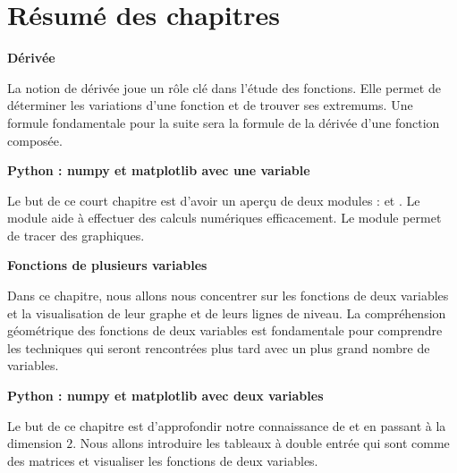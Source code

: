 

\cleardoublepage
\thispagestyle{empty}
\tableofcontents

\cleardoublepage
\section*{Résumé des chapitres}


\newcommand{\titrechapitre}[1]{{\textbf{#1}}\nopagebreak}
\newcommand{\descriptionchapitre}[1]{%
\smallskip\hfill
\begin{minipage}{0.95\textwidth}\small#1\end{minipage}\medskip\smallskip}

\titrechapitre{Dérivée}

\descriptionchapitre{La notion de dérivée joue un rôle clé dans l'étude des fonctions. Elle permet de déterminer les variations d'une fonction et de trouver ses extremums. Une formule fondamentale pour la suite sera la formule de la dérivée d'une fonction composée.}

\titrechapitre{Python : numpy et matplotlib avec une variable}

\descriptionchapitre{Le but de ce court chapitre est d'avoir un aperçu de deux modules \Python{} : \numpy{} et \matplotlib{}. Le module \numpy{} aide à effectuer des calculs numériques efficacement. Le module \matplotlib{} permet de tracer des graphiques.}

\titrechapitre{Fonctions de plusieurs variables}

\descriptionchapitre{Dans ce chapitre, nous allons nous concentrer sur les fonctions de deux variables et la visualisation de leur graphe et de leurs lignes de niveau. 
La compréhension géométrique des fonctions de deux variables est fondamentale pour comprendre les techniques qui seront rencontrées plus tard avec un plus grand nombre de variables.}

\titrechapitre{Python : numpy et matplotlib avec deux variables}

\descriptionchapitre{Le but de ce chapitre est d'approfondir notre connaissance de \numpy{} et \matplotlib{} en passant à la dimension $2$. Nous allons introduire les tableaux à double entrée qui sont comme des matrices et visualiser les fonctions de deux variables.}

